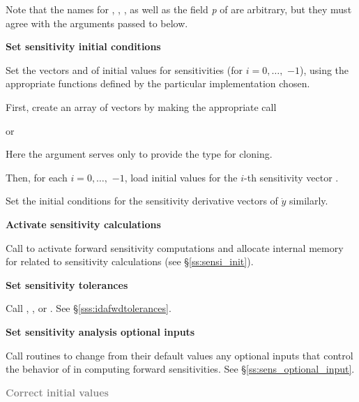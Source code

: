 \begin{Steps}
    Note that the names for , , , as well as the field
    {\em p} of  are arbitrary, but they must agree with the arguments
    passed to  below.

\item
  {\bf Set sensitivity initial conditions}

  Set the  vectors  and  of initial values
  for sensitivities (for $i=0,\ldots,$  $ - 1$), using the
  appropriate functions defined by the particular {\nvector} implementation chosen.

  First, create an array of  vectors by making the appropriate call


  or


  Here the argument  serves only to provide the 
  type for cloning.

  Then, for each $i = 0,\ldots, $ $ - 1$, load initial values
  for the $i$-th sensitivity vector .

  Set the initial conditions for the  sensitivity derivative vectors 
  of $\dot{y}$ similarly.

\item
  {\bf Activate sensitivity calculations}

  Call \id{(\ldots);} to activate forward 
  sensitivity computations and allocate internal memory for {\idas} related 
  to sensitivity calculations (see \S\ref{ss:sensi_init}).

\item
  {\bf Set sensitivity tolerances}

  Call , , or .
  See \S\ref{sss:idafwdtolerances}.

\item
  {\bf Set sensitivity analysis optional inputs}

  Call  routines to change from their default values any
  optional inputs that control the behavior of {\idas} in computing forward 
  sensitivities.  See \S\ref{ss:sens_optional_input}.

\item
  \textcolor{gray}{\bf Correct initial values}


\end{Steps}
